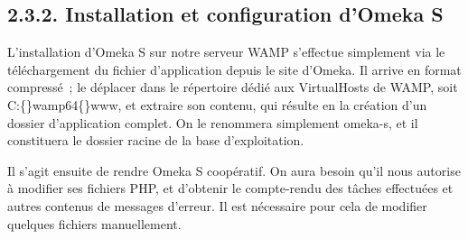 \documentclass[a4paper,12pt, twoside]{book}
\begin{document}
\subsection*{2.3.2. Installation et configuration d’Omeka S}

L’installation d’Omeka S sur notre serveur WAMP s’effectue simplement via le téléchargement du fichier d’application depuis le site d’Omeka. Il arrive en format compressé~; le déplacer dans le répertoire dédié aux VirtualHosts de WAMP, soit \textsf{C:\{\}wamp64\{\}www}, et extraire son contenu, qui résulte en la création d’un dossier d’application complet. On le renommera simplement \textsf{omeka-s}, et il constituera le dossier racine de la base d’exploitation.

Il s’agit ensuite de rendre Omeka S coopératif. On aura besoin qu’il nous autorise à modifier ses fichiers PHP, et d’obtenir le compte-rendu des tâches effectuées et autres contenus de messages d’erreur. Il est nécessaire pour cela de modifier quelques fichiers manuellement.
\end{document}
